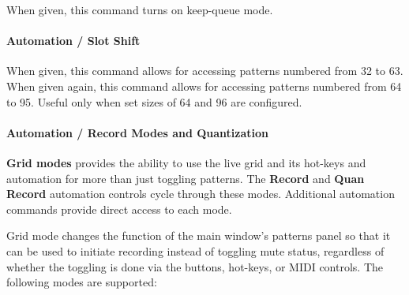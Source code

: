    When given, this command turns on keep-queue mode.

\paragraph{Automation / Slot Shift}
\label{paragraph:configuration_slot_shift}

   When given, this command allows for accessing patterns numbered
   from 32 to 63.
   When given again, this command allows for accessing patterns numbered
   from 64 to 95.
   Useful only when set sizes of 64 and 96 are configured.

\paragraph{Automation / Record Modes and Quantization}
\label{paragraph:configuration_midi_record_quan}

   \textbf{Grid modes} provides the ability to use the live grid and its
   hot-keys and automation for more than just toggling patterns.
   The \textbf{Record} and \textbf{Quan Record} automation controls
   cycle through these modes.
   Additional automation commands provide direct access to each mode.

   Grid mode changes the function of the main window's patterns panel so that
   it can be used to initiate recording instead of toggling mute status,
   regardless of whether the toggling is done via the buttons, hot-keys, or
   MIDI controls.  The following modes are supported:

